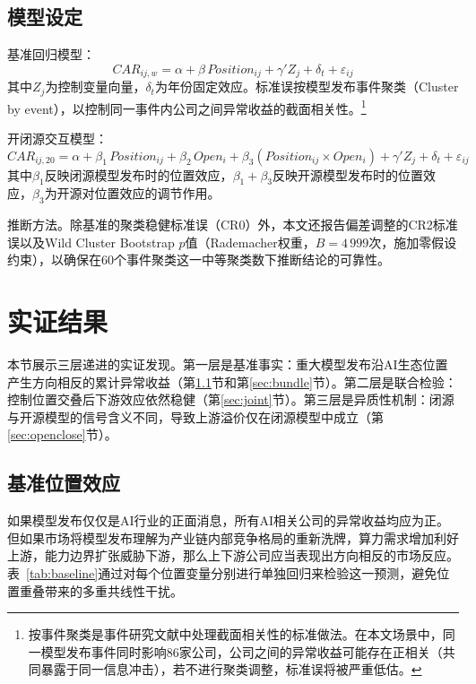 \documentclass[11pt,fontset=fandol,a4paper]{ctexart}
\begin{document}
\subsection{模型设定}

基准回归模型：
\begin{equation}\label{eq:baseline}
CAR_{ij,w}=\alpha+\beta\, Position_{ij}+\gamma' Z_j+\delta_t+\varepsilon_{ij}
\end{equation}
其中$Z_j$为控制变量向量，$\delta_t$为年份固定效应。标准误按模型发布事件聚类（Cluster by event），以控制同一事件内公司之间异常收益的截面相关性。\footnote{按事件聚类是事件研究文献中处理截面相关性的标准做法。在本文场景中，同一模型发布事件同时影响86家公司，公司之间的异常收益可能存在正相关（共同暴露于同一信息冲击），若不进行聚类调整，标准误将被严重低估。}

开闭源交互模型：
\begin{equation}\label{eq:interaction}
CAR_{ij,20}=\alpha+\beta_1\, Position_{ij}+\beta_2\, Open_i+\beta_3(Position_{ij}\times Open_i)+\gamma' Z_j+\delta_t+\varepsilon_{ij}
\end{equation}
其中$\beta_1$反映闭源模型发布时的位置效应，$\beta_1+\beta_3$反映开源模型发布时的位置效应，$\beta_3$为开源对位置效应的调节作用。

推断方法。除基准的聚类稳健标准误（CR0）外，本文还报告偏差调整的CR2标准误以及Wild Cluster Bootstrap $p$值（Rademacher权重，$B=4\,999$次，施加零假设约束），以确保在60个事件聚类这一中等聚类数下推断结论的可靠性。


\section{实证结果}

本节展示三层递进的实证发现。第一层是基准事实：重大模型发布沿AI生态位置产生方向相反的累计异常收益（第\ref{sec:baseline}节和第\ref{sec:bundle}节）。第二层是联合检验：控制位置交叠后下游效应依然稳健（第\ref{sec:joint}节）。第三层是异质性机制：闭源与开源模型的信号含义不同，导致上游溢价仅在闭源模型中成立（第\ref{sec:openclose}节）。

\subsection{基准位置效应}\label{sec:baseline}

如果模型发布仅仅是AI行业的正面消息，所有AI相关公司的异常收益均应为正。但如果市场将模型发布理解为产业链内部竞争格局的重新洗牌，算力需求增加利好上游，能力边界扩张威胁下游，那么上下游公司应当表现出方向相反的市场反应。表~\ref{tab:baseline}通过对每个位置变量分别进行单独回归来检验这一预测，避免位置重叠带来的多重共线性干扰。
\end{document}

